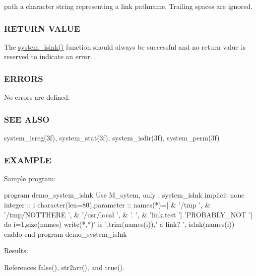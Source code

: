 path a character string representing a link pathname. Trailing spaces are ignored.

\subsubsection*{R\+E\+T\+U\+RN V\+A\+L\+UE}

The \hyperlink{namespacem__system_ab05694cc3d76a3ecc87e4b4490c4c217}{system\+\_\+islnk()} function should always be successful and no return value is reserved to indicate an error.

\subsubsection*{E\+R\+R\+O\+RS}

No errors are defined.

\subsubsection*{S\+EE A\+L\+SO}

system\+\_\+isreg(3f), system\+\_\+stat(3f), system\+\_\+isdir(3f), system\+\_\+perm(3f)

\subsubsection*{E\+X\+A\+M\+P\+LE}

\begin{DoxyVerb}    Sample program:

       program demo_system_islnk
       Use M_sytem, only : system_islnk
       implicit none
       integer                     :: i
       character(len=80),parameter :: names(*)=[ &
       '/tmp            ', &
       '/tmp/NOTTHERE   ', &
       '/usr/local      ', &
       '.               ', &
       'link.test       ']
       'PROBABLY_NOT    ']
       do i=1,size(names)
          write(*,*)' is ',trim(names(i)),' a link? ', islnk(names(i))
       enddo
       end program demo_system_islnk

    Results: \end{DoxyVerb}
 

References false(), str2arr(), and true().

\mbox{\label{namespacem__system_a127bdd84ccd4b52f3f29abbc56af029b}} 
